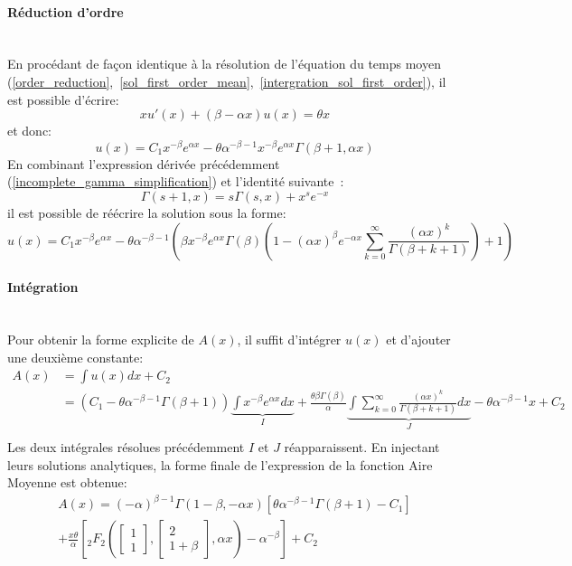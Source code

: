 \paragraph{Réduction d'ordre}\phantom{}\\
En procédant de façon identique à la résolution de l'équation du temps moyen (\ref{order_reduction},~\ref{sol_first_order_mean},~\ref{intergration_sol_first_order}), il est possible d'écrire: 
\[xu'(x)+(\beta-\alpha x)u(x)=\theta x\]
et donc: 
\[u(x)=C_1x^{-\beta} e^{\alpha x} -\theta\alpha^{-\beta-1}x^{-\beta} e^{\alpha x}\Gamma(\beta+1, \alpha x)\]
En combinant l'expression dérivée précédemment (\ref{incomplete_gamma_simplification}) et l'identité suivante~\cite{NIST:DLMF}: 
\[\Gamma(s+1, x)=s\Gamma(s, x)+x^s e^{-x}\]
il est possible de réécrire la solution sous la forme: 
\[
u(x)=C_1x^{-\beta} e^{\alpha x} -\theta\alpha^{-\beta-1}\left(\beta x^{-\beta}e^{\alpha x}\Gamma(\beta)\left(1-{(\alpha x)}^\beta e^{-\alpha x}\sum_{k=0}^{\infty} \frac{{(\alpha x)}^k}{\Gamma(\beta+k+1)}\right)+1\right)
\]

\paragraph{Intégration}\phantom{}\\
Pour obtenir la forme explicite de $A(x)$, il suffit d'intégrer $u(x)$ et d'ajouter une deuxième constante:
\[
\begin{aligned}
    A(x) &= \int u(x)dx+C_2 \\
    &= (C_1-\theta\alpha^{-\beta-1}\Gamma(\beta+1))\underbrace{\int x^{-\beta}e^{\alpha x}dx}_I +\frac{\theta\beta\Gamma(\beta)}{\alpha}\underbrace{\int\sum_{k=0}^{\infty} \frac{{(\alpha x)}^k}{\Gamma(\beta+k+1)}dx}_J-\theta\alpha^{-\beta-1}x +C_2 \\
\end{aligned}
\]
Les deux intégrales résolues précédemment $I$ et $J$ réapparaissent. En injectant leurs solutions analytiques, la forme finale de l'expression de la fonction Aire Moyenne est obtenue: 
\begin{equation}\label{sol_area}
    \begin{aligned}
            A(x) = {(-\alpha)}^{\beta-1}\Gamma(1-\beta,-\alpha x)[\theta\alpha^{-\beta-1}\Gamma(\beta+1)-C_1]\\+\frac{x\theta}{\alpha}\left[{}_2F_2\left(\begin{bmatrix}1\\1\end{bmatrix},\begin{bmatrix}2\\1+\beta\end{bmatrix},\alpha x\right)-\alpha^{-\beta}\right] +C_2 
    \end{aligned}
\end{equation}


